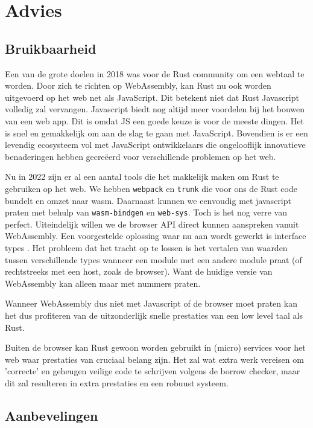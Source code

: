 \chapter{Advies}

\section{Bruikbaarheid}

Een van de grote doelen in 2018 was voor de Rust community om een webtaal te worden. Door zich te
richten op WebAssembly, kan Rust nu ook worden uitgevoerd op het web net als JavaScript. Dit
betekent niet dat Rust Javascript volledig zal vervangen. Javascript biedt nog altijd meer voordelen
bij het bouwen van een web app. Dit is omdat JS een goede keuze is voor de meeste dingen. Het is
snel en gemakkelijk om aan de slag te gaan met JavaScript. Bovendien is er een levendig ecosysteem
vol met JavaScript ontwikkelaars die ongelooflijk innovatieve benaderingen hebben gecreëerd voor
verschillende problemen op het web.

Nu in 2022 zijn er al een aantal tools die het makkelijk maken om Rust te gebruiken op het web. We
hebben \texttt{webpack} en \texttt{trunk} die voor ons de Rust code bundelt en
omzet naar wasm. Daarnaast kunnen we eenvoudig met javascript praten met behulp van
\texttt{wasm-bindgen} en \texttt{web-sys}. Toch is het nog verre van perfect.
Uiteindelijk willen we de browser API direct kunnen aanspreken vanuit WebAssembly. Een voorgestelde
oplossing waar nu aan wordt gewerkt is interface types \cite{wasm_interfaces}. Het probleem dat het
tracht op te lossen is het vertalen van waarden tussen verschillende types wanneer een module met
een andere module praat (of rechtstreeks met een host, zoals de browser). Want de huidige versie van
WebAssembly kan alleen maar met nummers praten. 

Wanneer WebAssembly dus niet met Javascript of de browser moet praten kan het dus profiteren van de
uitzonderlijk snelle prestaties van een low level taal als Rust.

Buiten de browser kan Rust gewoon worden gebruikt in (micro) services voor het web waar prestaties
van cruciaal belang zijn. Het zal wat extra werk vereisen om 'correcte' en geheugen veilige code te
schrijven volgens de borrow checker, maar dit zal resulteren in extra prestaties en een robuust
systeem.

\clearpage

\section{Aanbevelingen}


